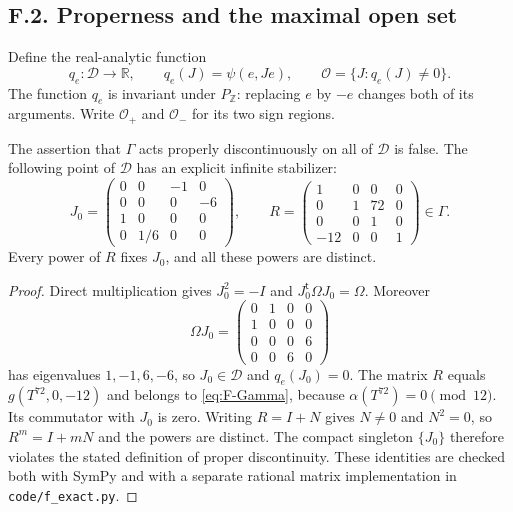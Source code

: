 \subsection{F.2. Properness and the maximal open set}

Define the real-analytic function
\[
 q_e:\mathcal D\longrightarrow\mathbb R,\qquad q_e(J)=\psi(e,Je),
 \qquad\mathcal O=\{J:q_e(J)\ne0\}.
\]
The function $q_e$ is invariant under $P_{\mathbb Z}$: replacing $e$ by
$-e$ changes both of its arguments.  Write $\mathcal O_+$ and
$\mathcal O_-$ for its two sign regions.

\begin{proposition}[F.2.1; Refuted]\label{st:F.2.1}
The assertion that $\Gamma$ acts properly discontinuously on all of
$\mathcal D$ is false.  The following point of $\mathcal D$ has an
explicit infinite stabilizer:
\[
 J_0=\begin{pmatrix}
 0&0&-1&0\\0&0&0&-6\\1&0&0&0\\0&1/6&0&0
 \end{pmatrix},\qquad
 R=\begin{pmatrix}
 1&0&0&0\\0&1&72&0\\0&0&1&0\\-12&0&0&1
 \end{pmatrix}\in\Gamma.
\]
Every power of $R$ fixes $J_0$, and all these powers are distinct.
\end{proposition}

\begin{proof}
Direct multiplication gives $J_0^2=-I$ and
$J_0^{\mathsf t}\Omega J_0=\Omega$.  Moreover
\[
 \Omega J_0=\begin{pmatrix}
 0&1&0&0\\1&0&0&0\\0&0&0&6\\0&0&6&0
 \end{pmatrix}
\]
has eigenvalues $1,-1,6,-6$, so $J_0\in\mathcal D$ and $q_e(J_0)=0$.
The matrix $R$ equals $g(T^{72},0,-12)$ and belongs to \eqref{eq:F-Gamma},
because $\alpha(T^{72})=0\pmod{12}$.  Its commutator with $J_0$ is zero.
Writing $R=I+N$ gives $N\ne0$ and $N^2=0$, so $R^m=I+mN$ and the
powers are distinct.  The compact singleton $\{J_0\}$ therefore violates
the stated definition of proper discontinuity.  These identities are
checked both with SymPy and with a separate rational matrix
implementation in \texttt{code/f\_exact.py}.
\end{proof}


